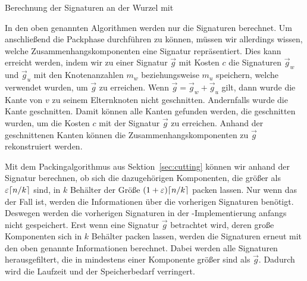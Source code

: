 \begin{algorithm}[H]
    \caption{Berechnung der Signaturen an der Wurzel mit \carfun{}}\label{alg:carfun}
    \begin{algorithmic}[1]
                \EndFor
           \EndFor
        \EndFunction
    \end{algorithmic}
\end{algorithm}

\begin{rem}\label{rem:components}
    In den oben genannten Algorithmen werden nur die Signaturen berechnet.
    Um anschließend die Packphase durchführen zu können, müssen wir allerdings wissen, welche Zusammenhangskomponenten eine Signatur repräsentiert.
    Dies kann erreicht werden, indem wir zu einer Signatur $\vec{g}$ mit Kosten $c$ die Signaturen $\vec{g}_w$ und $\vec{g}_u$ mit den Knotenanzahlen $m_w$ beziehungsweise $m_u$ speichern, welche verwendet wurden, um $\vec{g}$ zu erreichen.
    Wenn $\vec{g} = \vec{g}_w + \vec{g}_u$ gilt, dann wurde die Kante von $v$ zu seinem Elternknoten nicht geschnitten.
    Andernfalls wurde die Kante geschnitten.
    Damit können alle Kanten gefunden werden, die geschnitten wurden, um die Kosten $c$ mit der Signatur $\vec{g}$ zu erreichen.
    Anhand der geschnittenen Kanten können die Zusammenhangskomponenten zu $\vec{g}$ rekonstruiert werden.

    Mit dem Packingalgorithmus aus Sektion~\ref{sec:cutting} können wir anhand der Signatur berechnen, ob sich die dazugehörigen Komponenten, die größer als $\varepsilon \lceil n/k\rceil$ sind, in $k$ Behälter der Größe $(1+\varepsilon) \lceil n/k\rceil$ packen lassen.
    Nur wenn das der Fall ist, werden die Informationen über die vorherigen Signaturen benötigt.
    Deswegen werden die vorherigen Signaturen in der \Cpp{}\hyp Implementierung anfangs nicht gespeichert.
    Erst wenn eine Signatur $\vec{g}$ betrachtet wird, deren große Komponenten sich in $k$ Behälter packen lassen, werden die Signaturen erneut mit den oben genannte Informationen berechnet.
    Dabei werden alle Signaturen herausgefiltert, die in mindestens einer Komponente größer sind als $\vec{g}$.
    Dadurch wird die Laufzeit und der Speicherbedarf verringert.
\end{rem}

